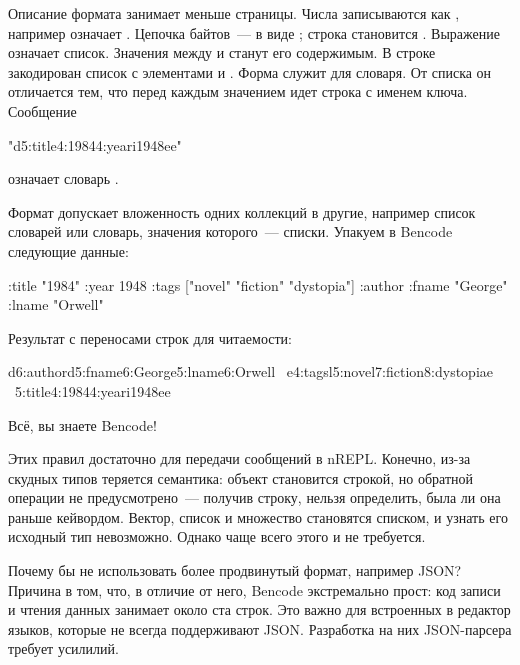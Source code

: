 Описание формата занимает меньше страницы. Числа записываются как , например  означает . Цепочка байтов~--- в виде ; строка  становится . Выражение  означает список. Значения между  и  станут его содержимым. В строке  закодирован список с элементами  и . Форма  служит для словаря. От списка он отличается тем, что перед каждым значением идет строка с именем ключа. Сообщение

\begin{english}
  \begin{text}
"d5:title4:19844:yeari1948ee"
  \end{text}
\end{english}

\noindent
означает словарь .

Формат допускает вложенность одних коллекций в другие, например список словарей или словарь, значения которого~--- списки. Упакуем в Bencode следующие данные:

\begin{english}
  \begin{clojure}
{:title "1984"
 :year 1948
 :tags ["novel" "fiction" "dystopia"]
 :author {:fname "George" :lname "Orwell"}}
  \end{clojure}
\end{english}

Результат с переносами строк для читаемости:

\begin{english}
  \begin{text}
d6:authord5:fname6:George5:lname6:Orwell \
e4:tagsl5:novel7:fiction8:dystopiae \
5:title4:19844:yeari1948ee
  \end{text}
\end{english}

Всё, вы знаете Bencode!

Этих правил достаточно для передачи сообщений в nREPL. Конечно, из-за скудных типов теряется семантика: объект  становится строкой, но обратной операции не предусмотрено~--- получив строку, нельзя определить, была ли она раньше кейвордом. Вектор, список и множество становятся списком, и узнать его исходный тип невозможно. Однако чаще всего этого и не требуется.

\index{JSON}

Почему бы не использовать более продвинутый формат, например JSON? Причина в том, что, в отличие от него, Bencode экстремально прост: код записи и чтения данных занимает около ста строк. Это важно для встроенных в редактор языков, которые не всегда поддерживают JSON. Разработка на них JSON-парсера требует усилилий.


